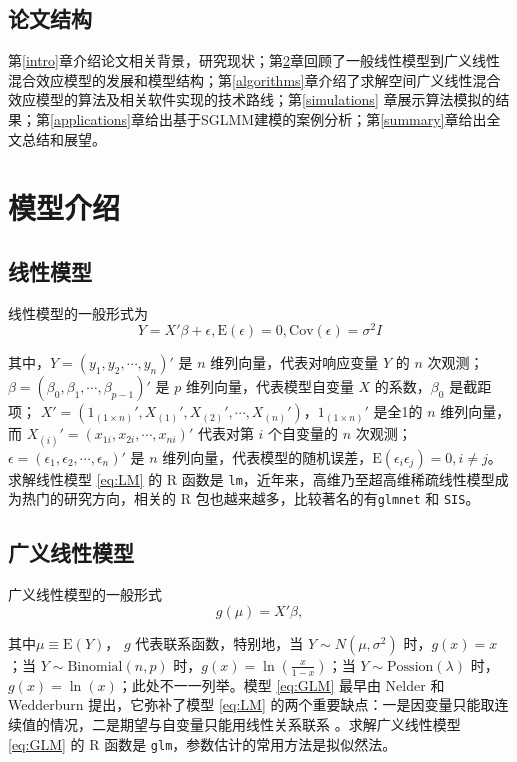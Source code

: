 \documentclass[hyperref, a4paper, UTF8, zihao = -4, linespread = 1.25, scheme = chinese]{ctexbook}
\begin{document}
\section{论文结构}

第\ref{intro}章介绍论文相关背景，研究现状；第\ref{models}章回顾了一般线性模型到广义线性混合效应模型的发展和模型结构；第\ref{algorithms}章介绍了求解空间广义线性混合效应模型的算法及相关软件实现的技术路线；第\ref{simulations}
章展示算法模拟的结果；第\ref{applications}章给出基于SGLMM建模的案例分析；第\ref{summary}章给出全文总结和展望。

\hypertarget{models}{%
\chapter{模型介绍}\label{models}}

\section{线性模型}

线性模型的一般形式为\begin{equation}
Y = X'\beta + \epsilon, \mathrm{E}(\epsilon) = 0, \mathrm{Cov}(\epsilon) = \sigma^2I  \label{eq:LM}
\end{equation}

其中，\(Y = (y_1,y_2,\cdots,y_n)'\) 是 \(n\) 维列向量，代表对响应变量
\(Y\) 的 \(n\) 次观测；
\(\beta = (\beta_0,\beta_1,\cdots,\beta_{p-1})'\) 是 \(p\)
维列向量，代表模型自变量 \(X\) 的系数，\(\beta_0\) 是截距项；
\(X' = (1_{(1\times n)}',X_{(1)}',X_{(2)}',\cdots,X_{(n)}')\)，\(1_{(1\times n)}'\)
是全1的 \(n\) 维列向量，而 \(X_{(i)}' = (x_{1i},x_{2i},\cdots,x_{ni})'\)
代表对第 \(i\) 个自变量的 \(n\) 次观测；
\(\epsilon = (\epsilon_1,\epsilon_2,\cdots,\epsilon_n)'\) 是 \(n\)
维列向量，代表模型的随机误差，\(\mathrm{E}(\epsilon_i \epsilon_j) = 0, i \ne j\)。
求解线性模型 \eqref{eq:LM} 的 R 函数是
\texttt{lm}，近年来，高维乃至超高维稀疏线性模型成为热门的研究方向，相关的
R 包也越来越多，比较著名的有\texttt{glmnet}\citep{glmnet2011JSS} 和
\texttt{SIS}\citep{SIS2016JSS}。

\section{广义线性模型}

广义线性模型的一般形式\begin{equation}
g(\mu) = X'\beta,  \label{eq:GLM}
\end{equation}

其中\(\mu \equiv \mathrm{E}(Y)\)， \(g\) 代表联系函数，特别地，当
\(Y \sim N(\mu,\sigma^2)\) 时，\(g(x) = x\) ；当
\(Y \sim \mathrm{Binomial}(n,p)\) 时，\(g(x)=\ln(\frac{x}{1-x})\)；当
\(Y \sim \mathrm{Possion}(\lambda)\)
时，\(g(x) = \ln(x)\)；此处不一一列举\citep{McCullagh1989}。模型
\eqref{eq:GLM} 最早由 Nelder 和 Wedderburn
\citep{Nelder1972}提出，它弥补了模型 \eqref{eq:LM}
的两个重要缺点：一是因变量只能取连续值的情况，二是期望与自变量只能用线性关系联系
\citep{Chen2011}。求解广义线性模型 \eqref{eq:GLM} 的 R 函数是
\texttt{glm}，参数估计的常用方法是拟似然法。
\end{document}
